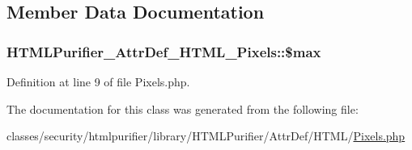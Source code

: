 \subsection{Member Data Documentation}
\hypertarget{classHTMLPurifier__AttrDef__HTML__Pixels_ac015b0271641ab15a9a78b6f770fbb8a}{
\subsubsection[{\$max}]{\setlength{\rightskip}{0pt plus 5cm}H\+T\+M\+L\+Purifier\+\_\+\+Attr\+Def\+\_\+\+H\+T\+M\+L\+\_\+\+Pixels\+::\$max\hspace{0.3cm}{\ttfamily [protected]}}}\label{classHTMLPurifier__AttrDef__HTML__Pixels_ac015b0271641ab15a9a78b6f770fbb8a}


Definition at line 9 of file Pixels.\+php.



The documentation for this class was generated from the following file\+:\begin{DoxyCompactItemize}
\item 
classes/security/htmlpurifier/library/\+H\+T\+M\+L\+Purifier/\+Attr\+Def/\+H\+T\+M\+L/\hyperlink{Pixels_8php}{Pixels.\+php}\end{DoxyCompactItemize}
